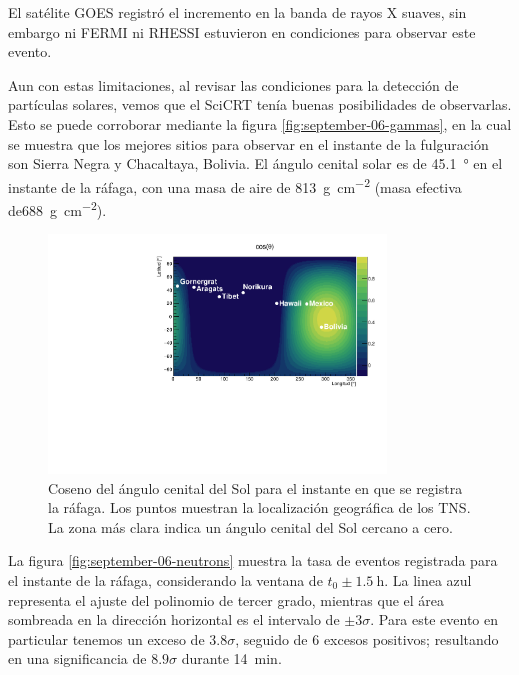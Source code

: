 El satélite GOES registró el incremento en la banda de rayos X suaves, sin embargo ni FERMI ni RHESSI estuvieron en condiciones para observar este evento.

Aun con estas limitaciones, al revisar las condiciones para la detección de partículas solares, vemos que el SciCRT tenía buenas posibilidades de observarlas. Esto se puede corroborar mediante la figura \ref{fig:september-06-gammas}, en la cual se muestra que los mejores sitios para observar en el instante de la fulguración son Sierra Negra y Chacaltaya, Bolivia. El ángulo cenital solar es de \SI{45.1}{\degree} en el instante de la ráfaga, con una masa de aire de \SI{813}{\gram\per\square\cm} (masa efectiva de\SI{688}{\gram\per\square\cm}).

\begin{figure}
        \centering
        \includegraphics[width=0.8\textwidth]{cosz_170906.pdf}
        \caption{Coseno del ángulo cenital del Sol para el instante en que se registra la ráfaga. Los puntos muestran la localización geográfica de los TNS. La zona más clara indica un ángulo cenital del Sol cercano a cero.}
        \label{fig:september-06-zenith}
\end{figure}

La figura \ref{fig:september-06-neutrons} muestra la tasa de eventos registrada para el instante de la ráfaga, considerando la ventana de $t_{0}\pm\SI{1.5}{\hour}$. La linea azul representa el ajuste del polinomio de tercer grado, mientras que el área sombreada en la dirección horizontal es el intervalo de $\pm 3\sigma$. Para este evento en particular tenemos un exceso de $3.8\sigma$, seguido de \num{6} excesos positivos; resultando en una significancia de $8.9\sigma$ durante \SI{14}{\minute}.

